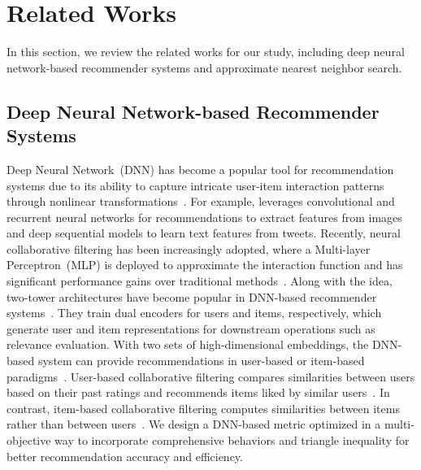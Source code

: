 \section{Related Works}
\label{sec:related_work}

In this section, we review the related works for our study, including deep neural network-based recommender systems and approximate nearest neighbor search.

\subsection{Deep Neural Network-based Recommender Systems}
Deep Neural Network~(DNN) has become a popular tool for recommendation systems due to its ability to capture intricate user-item interaction patterns through nonlinear transformations~\cite{zhang2019deep}.
For example, \cite{zhang2017hashtag} leverages convolutional and recurrent neural networks for recommendations to extract features from images and deep sequential models to learn text features from tweets.
Recently, neural collaborative filtering has been increasingly adopted, where a Multi-layer Perceptron~(MLP) is deployed to approximate the interaction function and has significant performance gains over traditional methods~\cite{he2017neural}.
Along with the idea, two-tower architectures have become popular in DNN-based recommender systems~\cite{yang2020mixed}. They train dual encoders for users and items, respectively, which generate user and item representations for downstream operations such as relevance evaluation.
With two sets of high-dimensional embeddings, the DNN-based system can provide recommendations in user-based or item-based paradigms~\cite{ko2022survey}.
User-based collaborative filtering compares similarities between users based on their past ratings and recommends items liked by similar users~\cite{zhang2020alleviating}.
In contrast, item-based collaborative filtering computes similarities between items rather than between users~\cite{xue2019deep}.
We design a DNN-based metric optimized in a multi-objective way to incorporate comprehensive behaviors and triangle inequality for better recommendation accuracy and efficiency.


